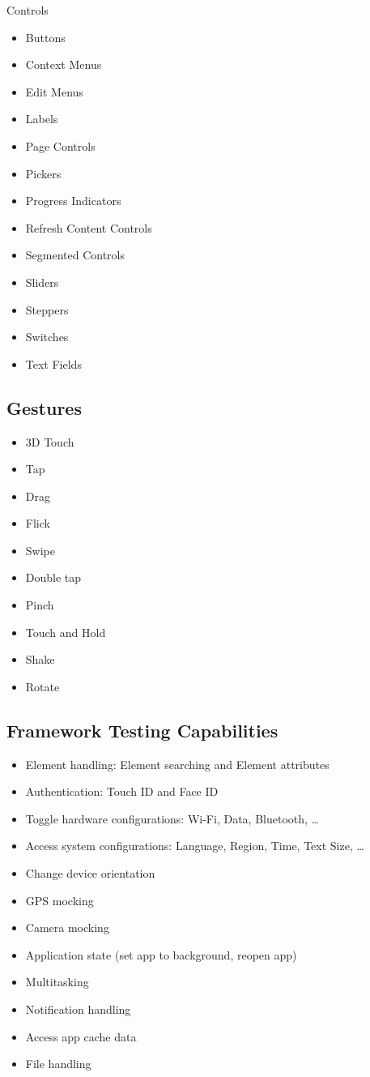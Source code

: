 	Controls
	\begin{itemize}
  		\item Buttons
		\item Context Menus
		\item Edit Menus
		\item Labels
		\item Page Controls
		\item Pickers
		\item Progress Indicators
		\item Refresh Content Controls
		\item Segmented Controls
		\item Sliders
		\item Steppers
		\item Switches
		\item Text Fields
	\end{itemize}

\subsection {Gestures}

	\begin{itemize}
  		\item 3D Touch
		\item Tap
		\item Drag
		\item Flick
		\item Swipe
		\item Double tap
		\item Pinch
		\item Touch and Hold
		\item Shake
		\item Rotate
	\end{itemize}

\subsection {Framework Testing Capabilities}
	\begin{itemize}
  		\item Element handling: Element searching and Element attributes
		\item Authentication: Touch ID and Face ID
		\item Toggle hardware configurations: Wi-Fi, Data, Bluetooth, …
		\item Access system configurations: Language, Region, Time, Text Size, …
		\item Change device orientation
		\item GPS mocking
		\item Camera mocking
		\item Application state (set app to background, reopen app)
		\item Multitasking
		\item Notification handling
		\item Access app cache  data
		\item File handling
	\end{itemize}
	
